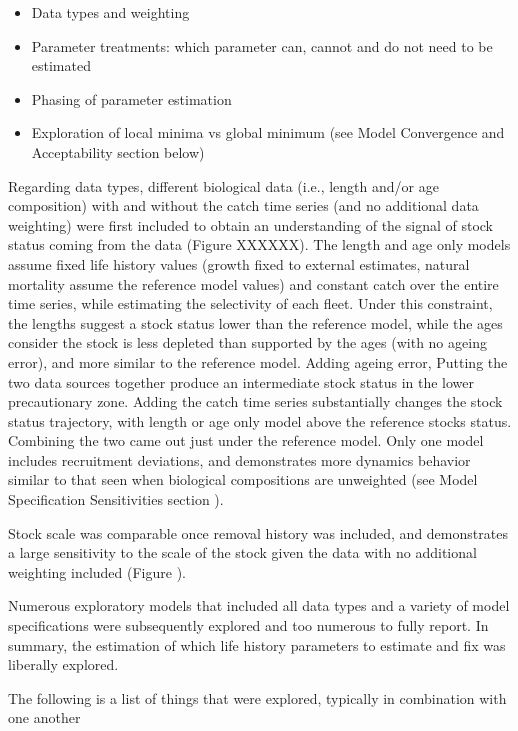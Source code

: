 \documentclass[
]{scrartcl}
\providecommand{\tightlist}{%
  \setlength{\itemsep}{0pt}\setlength{\parskip}{0pt}}\usepackage{longtable,booktabs,array}
\begin{document}
\begin{itemize}
\tightlist
\item
  Data types and weighting
\item
  Parameter treatments: which parameter can, cannot and do not need to
  be estimated
\item
  Phasing of parameter estimation
\item
  Exploration of local minima vs global minimum (see Model Convergence
  and Acceptability section below)
\end{itemize}

Regarding data types, different biological data (i.e., length and/or age
composition) with and without the catch time series (and no additional
data weighting) were first included to obtain an understanding of the
signal of stock status coming from the data (Figure XXXXXX). The length
and age only models assume fixed life history values (growth fixed to
external estimates, natural mortality assume the reference model values)
and constant catch over the entire time series, while estimating the
selectivity of each fleet. Under this constraint, the lengths suggest a
stock status lower than the reference model, while the ages consider the
stock is less depleted than supported by the ages (with no ageing
error), and more similar to the reference model. Adding ageing error,
Putting the two data sources together produce an intermediate stock
status in the lower precautionary zone. Adding the catch time series
substantially changes the stock status trajectory, with length or age
only model above the reference stocks status. Combining the two came out
just under the reference model. Only one model includes recruitment
deviations, and demonstrates more dynamics behavior similar to that seen
when biological compositions are unweighted (see Model Specification
Sensitivities section ).

Stock scale was comparable once removal history was included, and
demonstrates a large sensitivity to the scale of the stock given the
data with no additional weighting included (Figure ).

Numerous exploratory models that included all data types and a variety
of model specifications were subsequently explored and too numerous to
fully report. In summary, the estimation of which life history
parameters to estimate and fix was liberally explored.

The following is a list of things that were explored, typically in
combination with one another
\end{document}
